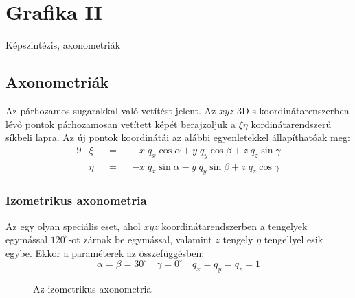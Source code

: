 \documentclass[../../main.tex]{subfiles}
\begin{document}
\section{Grafika II}

\begin{fulltheorem}
  Képszintézis, axonometriák
\end{fulltheorem}

\subsection{Axonometriák}

Az  párhozamos sugarakkal való vetítést jelent.
Az $xyz$ 3D-s koordináta\-renszerben lévő pontok párhozamosan vetített
képét berajzoljuk a $\xi \eta$ kordináta\-rendszerű síkbeli lapra.
Az új pontok koordinátái az alábbi egyenletekkel állapíthatóak meg:
\begin{alignat*}{9}
   & \xi  &  & = &  & - x \; q_x \cos \alpha + y \; q_y \cos \beta + z \; q_z \sin \gamma \\
   & \eta &  & = &  & - x \; q_x \sin \alpha - y \; q_y \sin \beta + z \; q_z \cos \gamma
\end{alignat*}

\subsubsection{Izometrikus axonometria}

Az  egy olyan speciális eset, ahol $xyz$
koordináta\-rendszerben a tengelyek egymással $120^\circ$-ot zárnak be
egymással, valamint $z$ tengely $\eta$ tengellyel esik egybe. Ekkor a
paraméterek az összefüggésben:
\[
  \alpha = \beta = 30^\circ
  \quad
  \gamma = 0^\circ
  \quad
  q_x = q_y = q_z = 1
\]
\begin{figure}[H]
  \centering
  \caption{Az izometrikus axonometria}
  \label{fig:isometric}
\end{figure}
\end{document}
